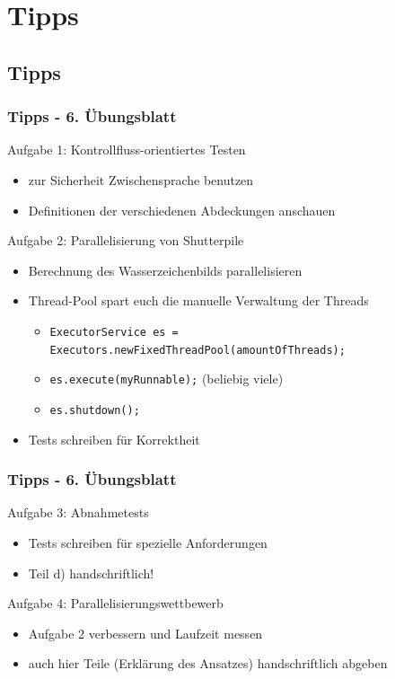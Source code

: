 \documentclass[18pt]{beamer}
\begin{document}
\section{Tipps}
	\subsection{Tipps}
	\begin{frame}
		\frametitle{Tipps - 6. Übungsblatt}
		\begin{exampleblock}{Aufgabe 1: Kontrollfluss-orientiertes Testen}
			\begin{itemize}
				\item zur Sicherheit Zwischensprache benutzen
				\item Definitionen der verschiedenen Abdeckungen anschauen
			\end{itemize}
		\end{exampleblock}
		\pause
		\begin{exampleblock}{Aufgabe 2: Parallelisierung von Shutterpile} 
			\begin{itemize}
				\item Berechnung des Wasserzeichenbilds parallelisieren \pause
				\item Thread-Pool spart euch die manuelle Verwaltung der Threads
				\begin{itemize}
					\item \texttt{ExecutorService es = Executors.newFixedThreadPool(amountOfThreads);}
					\item \texttt{es.execute(myRunnable);} (beliebig viele)
					\item \texttt{es.shutdown();}
				\end{itemize} \pause
				\item Tests schreiben für Korrektheit
			\end{itemize}
		\end{exampleblock}
	\end{frame}

	\begin{frame}
		\frametitle{Tipps - 6. Übungsblatt}
		\begin{exampleblock}{Aufgabe 3: Abnahmetests}
			\begin{itemize}
				\item Tests schreiben für spezielle Anforderungen
				\item Teil d) handschriftlich!
			\end{itemize}
		\end{exampleblock}
		\pause
		\begin{exampleblock}{Aufgabe 4: Parallelisierungswettbewerb}
			\begin{itemize}
				\item Aufgabe 2 verbessern und Laufzeit messen
				\item auch hier Teile (Erklärung des Ansatzes) handschriftlich abgeben
			\end{itemize}
		\end{exampleblock}
	\end{frame}
\end{document}
